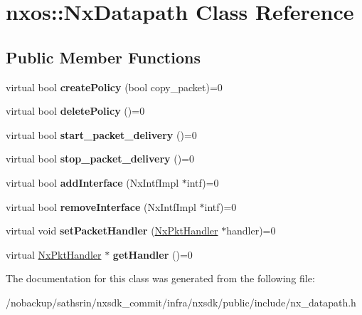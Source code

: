 \hypertarget{classnxos_1_1NxDatapath}{\section{nxos\-:\-:Nx\-Datapath Class Reference}
\label{classnxos_1_1NxDatapath}
}
\subsection*{Public Member Functions}
\begin{DoxyCompactItemize}
\item 
\hypertarget{classnxos_1_1NxDatapath_a776141b621998db198e7a0de5894b40f}{virtual bool {\bfseries create\-Policy} (bool copy\-\_\-packet)=0}\label{classnxos_1_1NxDatapath_a776141b621998db198e7a0de5894b40f}

\item 
\hypertarget{classnxos_1_1NxDatapath_ae3b4683dfc27d502b91ae58eecb23c5a}{virtual bool {\bfseries delete\-Policy} ()=0}\label{classnxos_1_1NxDatapath_ae3b4683dfc27d502b91ae58eecb23c5a}

\item 
\hypertarget{classnxos_1_1NxDatapath_aad971c451252484be054bad188111149}{virtual bool {\bfseries start\-\_\-packet\-\_\-delivery} ()=0}\label{classnxos_1_1NxDatapath_aad971c451252484be054bad188111149}

\item 
\hypertarget{classnxos_1_1NxDatapath_ae4a1eb0c918c4dfa1ffe116e03475fd9}{virtual bool {\bfseries stop\-\_\-packet\-\_\-delivery} ()=0}\label{classnxos_1_1NxDatapath_ae4a1eb0c918c4dfa1ffe116e03475fd9}

\item 
\hypertarget{classnxos_1_1NxDatapath_ae0c3412cbcb957e6b34ee15e7ed7a042}{virtual bool {\bfseries add\-Interface} (Nx\-Intf\-Impl $\ast$intf)=0}\label{classnxos_1_1NxDatapath_ae0c3412cbcb957e6b34ee15e7ed7a042}

\item 
\hypertarget{classnxos_1_1NxDatapath_a421a832b6aaebede8cbb3c49dd2c5378}{virtual bool {\bfseries remove\-Interface} (Nx\-Intf\-Impl $\ast$intf)=0}\label{classnxos_1_1NxDatapath_a421a832b6aaebede8cbb3c49dd2c5378}

\item 
\hypertarget{classnxos_1_1NxDatapath_a069f2c68e936fbb9dbd337236639f2e2}{virtual void {\bfseries set\-Packet\-Handler} (\hyperlink{classnxos_1_1NxPktHandler}{Nx\-Pkt\-Handler} $\ast$handler)=0}\label{classnxos_1_1NxDatapath_a069f2c68e936fbb9dbd337236639f2e2}

\item 
\hypertarget{classnxos_1_1NxDatapath_a68a0089467a8d3e346a37d8d911bce4d}{virtual \hyperlink{classnxos_1_1NxPktHandler}{Nx\-Pkt\-Handler} $\ast$ {\bfseries get\-Handler} ()=0}\label{classnxos_1_1NxDatapath_a68a0089467a8d3e346a37d8d911bce4d}

\end{DoxyCompactItemize}


The documentation for this class was generated from the following file\-:\begin{DoxyCompactItemize}
\item 
/nobackup/sathsrin/nxsdk\-\_\-commit/infra/nxsdk/public/include/nx\-\_\-datapath.\-h\end{DoxyCompactItemize}
